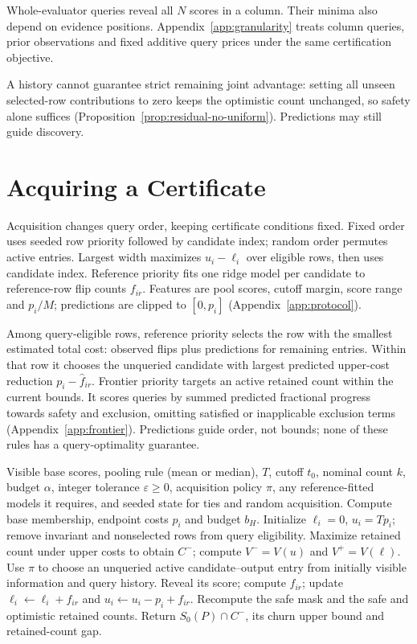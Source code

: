 \documentclass[11pt]{article}
\begin{document}
Whole-evaluator queries reveal all $N$ scores in a column. Their minima also depend on evidence positions. Appendix~\ref{app:granularity} treats column queries, prior observations and fixed additive query prices under the same certification objective.

A history cannot guarantee strict remaining joint advantage: setting all unseen selected-row contributions to zero keeps the optimistic count unchanged, so safety alone suffices (Proposition~\ref{prop:residual-no-uniform}). Predictions may still guide discovery.

\section{Acquiring a Certificate}
\label{sec:acquisition}
Acquisition changes query order, keeping certificate conditions fixed. Fixed order uses seeded row priority followed by candidate index; random order permutes active entries. Largest width maximizes $u_i-\ell_i$ over eligible rows, then uses candidate index. Reference priority fits one ridge model per candidate to reference-row flip counts $f_{ir}$. Features are pool scores, cutoff margin, score range and $p_i/M$; predictions are clipped to $[0,p_i]$ (Appendix~\ref{app:protocol}).

Among query-eligible rows, reference priority selects the row with the smallest estimated total cost: observed flips plus predictions for remaining entries. Within that row it chooses the unqueried candidate with largest predicted upper-cost reduction $p_i-\hat f_{ir}$. Frontier priority targets an active retained count within the current bounds. It scores queries by summed predicted fractional progress towards safety and exclusion, omitting satisfied or inapplicable exclusion terms (Appendix~\ref{app:frontier}). Predictions guide order, not bounds; none of these rules has a query-optimality guarantee.

\begin{algorithm}[t]
\caption{Score inspection for certified retention}
\label{alg:inspect}
\begin{algorithmic}[1]
\REQUIRE Visible base scores, pooling rule (mean or median), $T$, cutoff $t_0$, nominal count $k$, budget $\alpha$, integer tolerance $\varepsilon\ge0$, acquisition policy $\pi$, any reference-fitted models it requires, and seeded state for ties and random acquisition.
\STATE Compute base membership, endpoint costs $p_i$ and budget $b_H$.
\STATE Initialize $\ell_i=0$, $u_i=Tp_i$; remove invariant and nonselected rows from query eligibility.
\STATE Maximize retained count under upper costs to obtain $C^-$; compute $V^-=V(u)$ and $V^+=V(\ell)$.
\STATE Use $\pi$ to choose an unqueried active candidate--output entry from initially visible information and query history.
\STATE Reveal its score; compute $f_{ir}$; update $\ell_i\gets\ell_i+f_{ir}$ and $u_i\gets u_i-p_i+f_{ir}$.
\STATE Recompute the safe mask and the safe and optimistic retained counts.
\ENDWHILE
\STATE Return $S_0(P)\cap C^-$, its churn upper bound and retained-count gap.
\end{algorithmic}
\end{algorithm}
\end{document}
